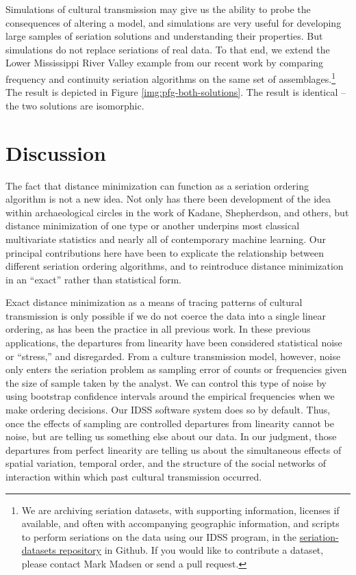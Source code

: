 \documentclass[graybox,natbib]{svmult}
\begin{document}
Simulations of cultural transmission may give us the ability to probe
the consequences of altering a model, and simulations are very useful
for developing large samples of seriation solutions and understanding
their properties. But simulations do not replace seriations of real
data. To that end, we extend the Lower Mississippi River Valley example
from our recent work \citep{lipomadsendunnell2015} by comparing
frequency and continuity seriation algorithms on the same set of
assemblages.\footnote{We are archiving seriation datasets, with
  supporting information, licenses if available, and often with
  accompanying geographic information, and scripts to perform seriations
  on the data using our IDSS program, in the
  \href{https://github.com/mmadsen/seriation-datasets}{seriation-datasets
  repository} in Github. If you would like to contribute a dataset,
  please contact Mark Madsen or send a pull request.} The result is
depicted in Figure \ref{img:pfg-both-solutions}. The result is identical
-- the two solutions are isomorphic.

\section{Discussion}\label{discussion}

The fact that distance minimization can function as a seriation ordering
algorithm is not a new idea. Not only has there been development of the
idea within archaeological circles in the work of Kadane, Shepherdson,
and others, but distance minimization of one type or another underpins
most classical multivariate statistics and nearly all of contemporary
machine learning. Our principal contributions here have been to
explicate the relationship between different seriation ordering
algorithms, and to reintroduce distance minimization in an ``exact''
rather than statistical form.

Exact distance minimization as a means of tracing patterns of cultural
transmission is only possible if we do not coerce the data into a single
linear ordering, as has been the practice in all previous work. In these
previous applications, the departures from linearity have been
considered statistical noise or ``stress,'' and disregarded. From a
culture transmission model, however, noise only enters the seriation
problem as sampling error of counts or frequencies given the size of
sample taken by the analyst. We can control this type of noise by using
bootstrap confidence intervals around the empirical frequencies when we
make ordering decisions. Our IDSS software system does so by default.
Thus, once the effects of sampling are controlled departures from
linearity cannot be noise, but are telling us something else about our
data. In our judgment, those departures from perfect linearity are
telling us about the simultaneous effects of spatial variation, temporal
order, and the structure of the social networks of interaction within
which past cultural transmission occurred.
\end{document}
